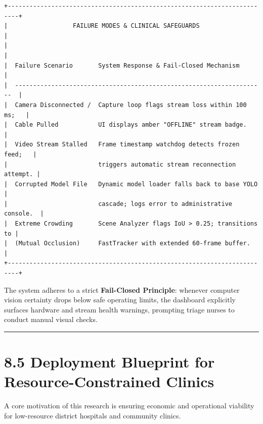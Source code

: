 \begin{verbatim}
+-------------------------------------------------------------------------+
|                  FAILURE MODES & CLINICAL SAFEGUARDS                    |
|                                                                         |
|  Failure Scenario       System Response & Fail-Closed Mechanism         |
|  ---------------------------------------------------------------------  |
|  Camera Disconnected /  Capture loop flags stream loss within 100 ms;   |
|  Cable Pulled           UI displays amber "OFFLINE" stream badge.       |
|  Video Stream Stalled   Frame timestamp watchdog detects frozen feed;   |
|                         triggers automatic stream reconnection attempt. |
|  Corrupted Model File   Dynamic model loader falls back to base YOLO    |
|                         cascade; logs error to administrative console.  |
|  Extreme Crowding       Scene Analyzer flags IoU > 0.25; transitions to |
|  (Mutual Occlusion)     FastTracker with extended 60-frame buffer.      |
+-------------------------------------------------------------------------+
\end{verbatim}

The system adheres to a strict \textbf{Fail-Closed Principle}: whenever
computer vision certainty drops below safe operating limits, the
dashboard explicitly surfaces hardware and stream health warnings,
prompting triage nurses to conduct manual visual checks.

\begin{center}\rule{0.5\linewidth}{0.5pt}\end{center}

\section{8.5 Deployment Blueprint for Resource-Constrained
Clinics}\label{deployment-blueprint-for-resource-constrained-clinics}

A core motivation of this research is ensuring economic and operational
viability for low-resource district hospitals and community clinics.

